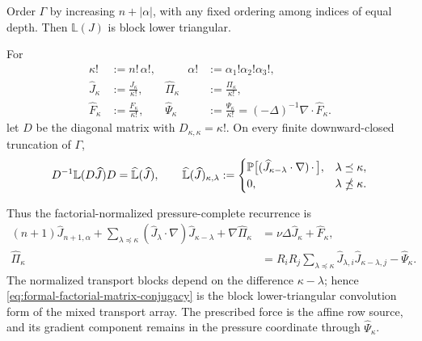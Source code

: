 \begin{proposition}
Order \(\Gamma\) by increasing \(n+|\alpha|\), with any fixed ordering among
indices of equal depth.  Then \(\mathbb L(J)\) is block lower triangular.
\begin{samepage}
For
\[
 \begin{aligned}
 \kappa!&:=n!\,\alpha!,
 &\qquad \alpha!&:=\alpha_1!\alpha_2!\alpha_3!,\\
 \widehat J_\kappa&:=\frac{J_\kappa}{\kappa!},
 &\widehat\Pi_\kappa&:=\frac{\Pi_\kappa}{\kappa!},\\
 \widehat F_\kappa&:=\frac{F_\kappa}{\kappa!},
 &\widehat\Psi_\kappa&:=\frac{\Psi_\kappa}{\kappa!}
 =(-\Delta)^{-1}\nabla\cdot\widehat F_\kappa.
 \end{aligned}
\]
let \(D\) be the diagonal matrix with \(D_{\kappa,\kappa}=\kappa!\).  On
every finite downward-closed truncation of \(\Gamma\),
\begin{equation}
 D^{-1}\mathbb L(D\widehat J)D
 =\widehat{\mathbb L}(\widehat J),
 \qquad
 \widehat{\mathbb L}(\widehat J)_{\kappa,\lambda}
 :=
 \begin{cases}
 \mathbb P\bigl[(\widehat J_{\kappa-\lambda}\cdot\nabla)
            \,\mathord\cdot\,\bigr],
 &\lambda\preceq\kappa,\\
 0,&\lambda\npreceq\kappa.
 \end{cases}
 \label{eq:formal-factorial-matrix-conjugacy}
\end{equation}
\end{samepage}
Thus the factorial-normalized pressure-complete recurrence is
\begin{align}
 (n+1)\widehat J_{n+1,\alpha}
 +\sum_{\lambda\preceq\kappa}
   (\widehat J_\lambda\cdot\nabla)
   \widehat J_{\kappa-\lambda}
 +\nabla\widehat\Pi_\kappa
 &=\nu\Delta\widehat J_\kappa+\widehat F_\kappa,
 \label{eq:formal-factorial-velocity-convolution}\\
 \widehat\Pi_\kappa
 &=R_iR_j\sum_{\lambda\preceq\kappa}
   \widehat J_{\lambda,i}\widehat J_{\kappa-\lambda,j}
   -\widehat\Psi_\kappa.
 \label{eq:formal-factorial-pressure-convolution}
\end{align}
The normalized transport blocks depend on the difference
\(\kappa-\lambda\); hence \eqref{eq:formal-factorial-matrix-conjugacy} is the
block lower-triangular convolution form of the mixed transport array.  The
prescribed force is the affine row source, and its gradient component remains
in the pressure coordinate through \(\widehat\Psi_\kappa\).
\end{proposition}

